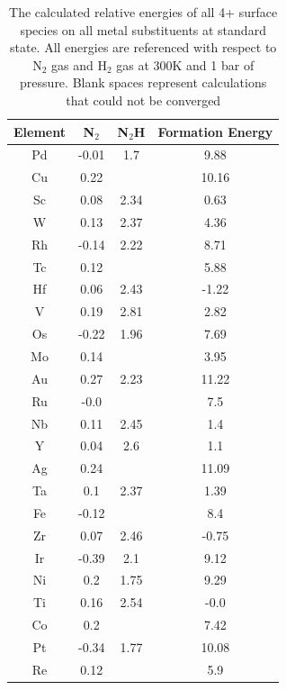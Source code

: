 \begin{table}
\begin{center}
\begin{tabular}{| c | c | c | c |}
\hline
Element & N$_2$ & N$_2$H & Formation Energy \\
\hline
Pd & -0.01 & 1.7 & 9.88 \\
Cu & 0.22 &  & 10.16 \\
Sc & 0.08 & 2.34 & 0.63 \\
W & 0.13 & 2.37 & 4.36 \\
Rh & -0.14 & 2.22 & 8.71 \\
Tc & 0.12 &  & 5.88 \\
Hf & 0.06 & 2.43 & -1.22 \\
V & 0.19 & 2.81 & 2.82 \\
Os & -0.22 & 1.96 & 7.69 \\
Mo & 0.14 &  & 3.95 \\
Au & 0.27 & 2.23 & 11.22 \\
Ru & -0.0 &  & 7.5 \\
Nb & 0.11 & 2.45 & 1.4 \\
Y & 0.04 & 2.6 & 1.1 \\
Ag & 0.24 &  & 11.09 \\
Ta & 0.1 & 2.37 & 1.39 \\
Fe & -0.12 &  & 8.4 \\
Zr & 0.07 & 2.46 & -0.75 \\
Ir & -0.39 & 2.1 & 9.12 \\
Ni & 0.2 & 1.75 & 9.29 \\
Ti & 0.16 & 2.54 & -0.0 \\
Co & 0.2 &  & 7.42 \\
Pt & -0.34 & 1.77 & 10.08 \\
Re & 0.12 &  & 5.9 \\
\hline
\end{tabular}
\end{center}
\label{table:4+_energies}
\caption{The calculated relative energies of all 4+ surface species on all metal substituents at standard state. All energies are referenced with respect to N$_2$ gas and H$_2$ gas at 300K and 1 bar of pressure. Blank spaces represent calculations that could not be converged}
\hline
\end{table}

